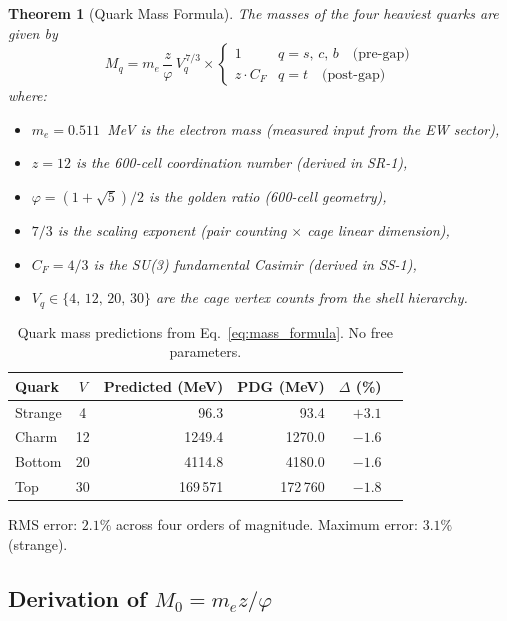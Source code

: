 \documentclass[11pt,letterpaper]{article}
\newtheorem{theorem}{Theorem}[section]
\newcommand{\phig}{\varphi}
\begin{document}
\begin{theorem}[Quark Mass Formula]
\label{thm:mass}
The masses of the four heaviest quarks are given by
\begin{equation}
\boxed{
  M_q = m_e \,\frac{z}{\phig}\, V_q^{\,7/3}
  \times
  \begin{cases}
    1 & q = s,\, c,\, b \quad\text{(pre-gap)}\\[4pt]
    z \cdot C_F & q = t \quad\text{(post-gap)}
  \end{cases}
}
\label{eq:mass_formula}
\end{equation}
where:
\begin{itemize}
\item $m_e = 0.511$~MeV is the electron mass (measured input from
  the EW sector),
\item $z = 12$ is the 600-cell coordination number (derived in SR-1),
\item $\phig = (1+\sqrt{5})/2$ is the golden ratio (600-cell geometry),
\item $7/3$ is the scaling exponent (pair counting $\times$ cage
  linear dimension),
\item $C_F = 4/3$ is the SU(3) fundamental Casimir (derived in SS-1),
\item $V_q \in \{4,\, 12,\, 20,\, 30\}$ are the cage vertex counts
  from the shell hierarchy.
\end{itemize}
\end{theorem}

\begin{table}[H]
\centering
\caption{Quark mass predictions from
Eq.~\eqref{eq:mass_formula}.  No free parameters.}
\label{tab:predictions}
\begin{tabular}{lcrrrr}
\toprule
Quark & $V$ & Predicted (MeV) & PDG (MeV) & $\Delta$ (\%) \\
\midrule
Strange & 4  &   96.3 &   93.4 & $+3.1$ \\
Charm   & 12 & 1249.4 & 1270.0 & $-1.6$ \\
Bottom  & 20 & 4114.8 & 4180.0 & $-1.6$ \\
Top     & 30 & 169\,571 & 172\,760 & $-1.8$ \\
\bottomrule
\end{tabular}
\end{table}

\noindent
RMS error: $2.1\%$ across four orders of magnitude.  Maximum error:
$3.1\%$ (strange).

\subsection{Derivation of $M_0 = m_e z / \phig$}
\label{sec:M0}
\end{document}
